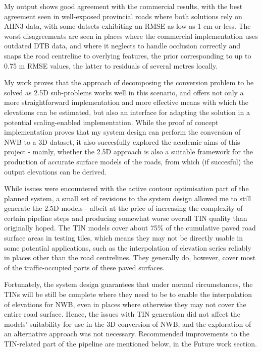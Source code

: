 My output shows good agreement with the commercial results, with the best agreement seen in well-exposed provincial roads where both solutions rely on AHN3 data, with some datsets exhibiting an RMSE as low as 1 cm or less. The worst disagreements are seen in places where the commercial implementation uses outdated DTB data, and where it neglects to handle occlusion correctly and snaps the road centreline to overlying features, the prior corresponding to up to 0.75 m RMSE values, the latter to residuals of several metres locally.

My work proves that the approach of decomposing the conversion problem to be solved as 2.5D sub-problems works well in this scenario, and offers not only a more straightforward implementation and more effective means with which the elevations can be estimated, but also an interface for adapting the solution in a potential scaling-enabled implementation. While the proof of concept implementation proves that my system design can perform the conversion of NWB to a 3D dataset, it also succesfully explored the academic aims of this project - mainly, whether the 2.5D approach is also a suitable framework for the production of accurate surface models of the roads, from which (if succesful) the output elevations can be derived.

While issues were encountered with the active contour optimisation part of the planned system, a small set of revisions to the system design allowed me to still generate the 2.5D models - albeit at the price of increasing the complexity of certain pipeline steps and producing somewhat worse overall TIN quality than originally hoped. The TIN models cover about 75\% of the cumulative paved road surface areas in testing tiles, which means they may not be directly usable in some potential applications, such as the interpolation of elevation series reliably in places other than the road centrelines. They generally do, however, cover most of the traffic-occupied parts of these paved surfaces.

Fortunately, the system design guarantees that under normal circumstances, the TINs will be still be complete where they need to be to enable the interpolation of elevations for NWB, even in places where otherwise they may not cover the entire road surface. Hence, the issues with TIN generation did not affect the models' suitability for use in the 3D conversion of NWB, and the exploration of an alternative approach was not necessary. Recommended improvements to the TIN-related part of the pipeline are mentioned below, in the Future work section.

